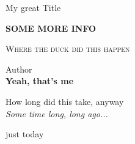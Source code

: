 \begin{titlepage}
	\begin{center}
		\vspace*{3cm}

		My great Title

		\vspace*{1cm}

		\large{ \textbf{ \uppercase{Some more info}}}

		\vspace{0.5cm}

		\vspace{1.5cm}

		\large{\textsc{Where the duck did this happen}}\\ 

		\vspace{0.8cm}        

		Author\\        
		\textbf{Yeah, that's me}

		\vspace{0.8cm}    
		How long did this take, anyway\\
		\textit{Some time long, long ago...}       

		\vspace{0.8cm}          

		\vspace{2cm}

		\vfill
		just today
	\end{center}
	\thispagestyle{empty}
\end{titlepage} 

\newpage
\thispagestyle{empty}
\mbox{}
